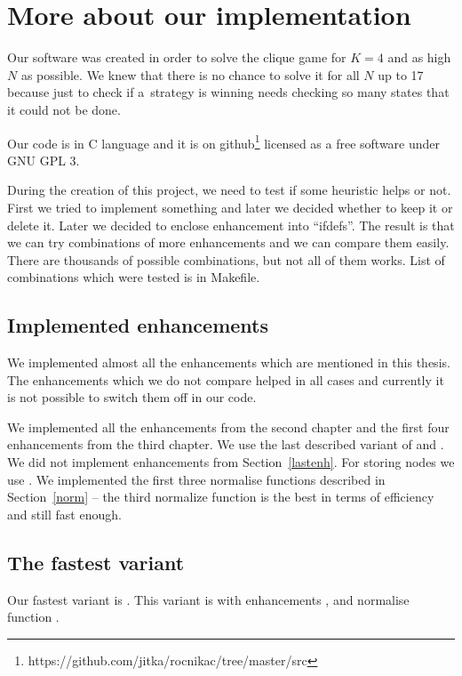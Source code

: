 \section{More about our implementation}

Our software was created in order to solve the clique game for $K=4$ and as high
$N$ as possible. We knew that there is no chance to solve it for all $N$ up
to 17 because just to check if a~strategy is winning needs checking so many
states that it could not be done. 
 
Our code is in C language and it is on
github\footnote{https://github.com/jitka/rocnikac/tree/master/src}
licensed as a free software under GNU GPL 3.

During the creation of this project, we need to test if some heuristic helps or
not. First we tried to implement something and later we decided whether to
keep it or delete it. Later we decided to enclose enhancement into ``ifdefs''.
The result is that we can try combinations of more enhancements and we can
compare them easily. There are thousands of possible combinations, but not all
of them works. List of combinations which were tested is in Makefile. 

\subsection{Implemented enhancements}

We implemented almost all the enhancements which are mentioned in this thesis. 
The enhancements which we do not compare helped in all cases and currently it is
not possible to switch them off in our code.

We implemented all the enhancements from the second chapter and the first four
enhancements from the third chapter. We use the last described variant of
 and . We did not implement
enhancements  from
Section~\ref{lastenh}. For storing nodes we use .
We implemented the first three normalise functions described in Section~\ref{norm} --
the third normalize function  is the best
in terms of efficiency and still fast enough.

\subsection{The fastest variant}

Our fastest variant is . This  variant is 
with enhancements ,  and normalise function
.

